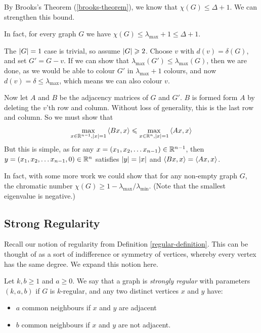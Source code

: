 \documentclass{article}
\begin{document}
By Brooks's Theorem (\ref{brooks-theorem}), we know that $\chi(G) \leq \Delta + 1$. We can strengthen this bound.

\begin{proposition}
    In fact, for every graph $G$ we have $\chi(G) \leq \lambda_\text{max} + 1 \leq \Delta + 1$.
\end{proposition}

\begin{prf}
    The $\left\lvert G \right\rvert = 1$ case is trivial, so assume $\left\lvert G \right\rvert \geqslant 2$. Choose $v$ with $d(v) = \delta(G)$, and set $G' = G - v$. If we can show that $\lambda_\text{max}(G') \leq \lambda_\text{max}(G)$, then we are done, as we would be able to colour $G'$ in $\lambda_\text{max} + 1$ colours, and now $d(v) = \delta \leq \lambda_\text{max}$, which means we can also colour $v$.
    
    Now let $A$ and $B$ be the adjacency matrices of $G$ and $G'$. $B$ is formed form $A$ by deleting the $v$'th row and column. Without loss of generality, this is the last row and column. So we must show that
    \[
	\max_{x \in \mathbb{R}^{n-1}, \left\lvert x \right\rvert = 1} \left\langle Bx, x \right\rangle \leqslant \max_{x \in \mathbb{R}^{n}, \left\lvert x \right\rvert = 1} \left\langle Ax, x \right\rangle
	\]
	But this is simple, as for any $x = (x_1, x_2, \dots x_{n-1}) \in \mathbb{R}^{n-1}$, then $y = (x_1, x_2, \dots x_{n-1}, 0) \in \mathbb{R}^{n}$ satisfies $\left\lvert y \right\rvert = \left\lvert x \right\rvert$ and $\left\langle Bx, x \right\rangle = \left\langle Ax, x \right\rangle$.
\end{prf}

In fact, with some more work we could show that for any non-empty graph $G$, the chromatic number $\chi(G) \geq 1 - \lambda_{\text{max}} / \lambda_{\text{min}}$. (Note that the smallest eigenvalue is negative.)


\subsection{Strong Regularity}

Recall our notion of regularity from Definition \ref{regular-definition}. This can be thought of as a sort of indifference or symmetry of vertices, whereby every vertex has the same degree. We expand this notion here.

\begin{definition}
    Let $k, b \geq 1$ and $a \geq 0$. We say that a graph is \textit{strongly regular} with parameters $(k, a, b)$ if $G$ is $k$-regular, and any two distinct vertices $x$ and $y$ have:
    \begin{itemize}
    	\item $a$ common neighbours if $x$ and $y$ are adjacent
    	\item $b$ common neighbours if $x$ and $y$ are not adjacent.
    \end{itemize}
\end{definition}
\end{document}
